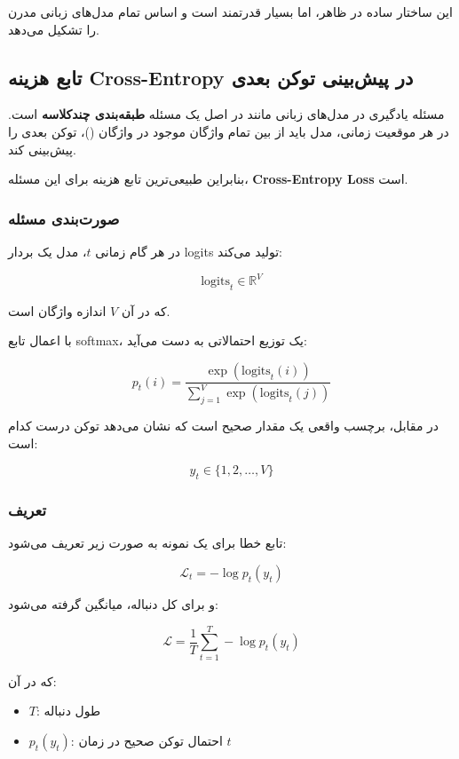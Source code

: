 \documentclass{article}
\begin{document}
این ساختار ساده در ظاهر، اما بسیار قدرتمند است و اساس تمام مدل‌های زبانی مدرن را تشکیل می‌دهد.

\subsection{تابع هزینه Cross-Entropy در پیش‌بینی توکن بعدی}

مسئله یادگیری در مدل‌های زبانی مانند  در اصل یک مسئله \textbf{طبقه‌بندی چندکلاسه} است. در هر موقعیت زمانی، مدل باید از بین تمام واژگان موجود در واژگان ()، توکن بعدی را پیش‌بینی کند.

بنابراین طبیعی‌ترین تابع هزینه برای این مسئله، \textbf{Cross-Entropy Loss} است.

\subsubsection*{صورت‌بندی مسئله}

در هر گام زمانی \( t \)، مدل یک بردار logits تولید می‌کند:

\[
\text{logits}_t \in \mathbb{R}^{V}
\]

که در آن \( V \) اندازه واژگان است.

با اعمال تابع softmax، یک توزیع احتمالاتی به دست می‌آید:

\[
p_t(i) = \frac{\exp(\text{logits}_t(i))}{\sum_{j=1}^{V} \exp(\text{logits}_t(j))}
\]

در مقابل، برچسب واقعی یک مقدار صحیح است که نشان می‌دهد توکن درست کدام است:

\[
y_t \in \{1, 2, \dots, V\}
\]

\subsubsection*{تعریف }

تابع خطا برای یک نمونه به صورت زیر تعریف می‌شود:

\[
\mathcal{L}_t = - \log p_t(y_t)
\]

و برای کل دنباله، میانگین گرفته می‌شود:

\[
\mathcal{L} = \frac{1}{T} \sum_{t=1}^{T} -\log p_t(y_t)
\]

که در آن:

\begin{itemize}
	\item \( T \): طول دنباله
	\item \( p_t(y_t) \): احتمال توکن صحیح در زمان \( t \)
\end{itemize}
\end{document}
